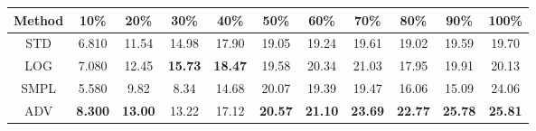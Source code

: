 \documentclass{standalone}
\begin{document}
\begin{tabular}{c|cccccccccc}
      \toprule
      Method & 10\% & 20\% & 30\% & 40\% & 50\% & 60\% & 70\% & 80\% & 90\% & 100\% \\
      \midrule
STD & 6.810 & 11.54 & 14.98 & 17.90 & 19.05 & 19.24 & 19.61 & 19.02 & 19.59 & 19.70\\
LOG & 7.080 & 12.45 & \textbf{15.73} & \textbf{18.47} & 19.58 & 20.34 & 21.03 & 17.95 & 19.91 & 20.13\\
SMPL & 5.580 & 9.82 & 8.34 & 14.68 & 20.07 & 19.39 & 19.47 & 16.06 & 15.09 & 24.06\\
ADV & \textbf{8.300} & \textbf{13.00} & 13.22 & 17.12 & \textbf{20.57} & \textbf{21.10} & \textbf{23.69} & \textbf{22.77} & \textbf{25.78} & \textbf{25.81}\\
  \bottomrule
\end{tabular}
\end{document}
